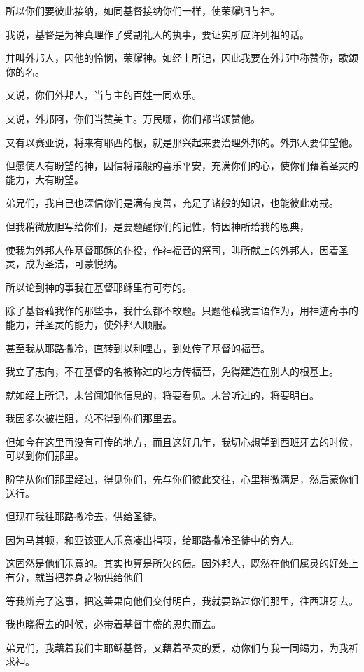 \documentclass[12pt,oneside]{book}
\begin{document}
所以你们要彼此接纳，如同基督接纳你们一样，使荣耀归与神。

我说，基督是为神真理作了受割礼人的执事，要证实所应许列祖的话。

并叫外邦人，因他的怜悯，荣耀神。如经上所记，因此我要在外邦中称赞你，歌颂你的名。

又说，你们外邦人，当与主的百姓一同欢乐。

又说，外邦阿，你们当赞美主。万民哪，你们都当颂赞他。

又有以赛亚说，将来有耶西的根，就是那兴起来要治理外邦的。外邦人要仰望他。

但愿使人有盼望的神，因信将诸般的喜乐平安，充满你们的心，使你们藉着圣灵的能力，大有盼望。

弟兄们，我自己也深信你们是满有良善，充足了诸般的知识，也能彼此劝戒。

但我稍微放胆写给你们，是要题醒你们的记性，特因神所给我的恩典，

使我为外邦人作基督耶稣的仆役，作神福音的祭司，叫所献上的外邦人，因着圣灵，成为圣洁，可蒙悦纳。

所以论到神的事我在基督耶稣里有可夸的。

除了基督藉我作的那些事，我什么都不敢题。只题他藉我言语作为，用神迹奇事的能力，并圣灵的能力，使外邦人顺服。

甚至我从耶路撒冷，直转到以利哩古，到处传了基督的福音。

我立了志向，不在基督的名被称过的地方传福音，免得建造在别人的根基上。

就如经上所记，未曾闻知他信息的，将要看见。未曾听过的，将要明白。

我因多次被拦阻，总不得到你们那里去。

但如今在这里再没有可传的地方，而且这好几年，我切心想望到西班牙去的时候，可以到你们那里。

盼望从你们那里经过，得见你们，先与你们彼此交往，心里稍微满足，然后蒙你们送行。

但现在我往耶路撒冷去，供给圣徒。

因为马其顿，和亚该亚人乐意凑出捐项，给耶路撒冷圣徒中的穷人。

这固然是他们乐意的。其实也算是所欠的债。因外邦人，既然在他们属灵的好处上有分，就当把养身之物供给他们

等我辨完了这事，把这善果向他们交付明白，我就要路过你们那里，往西班牙去。

我也晓得去的时候，必带着基督丰盛的恩典而去。

弟兄们，我藉着我们主耶稣基督，又藉着圣灵的爱，劝你们与我一同竭力，为我祈求神。
\end{document}

